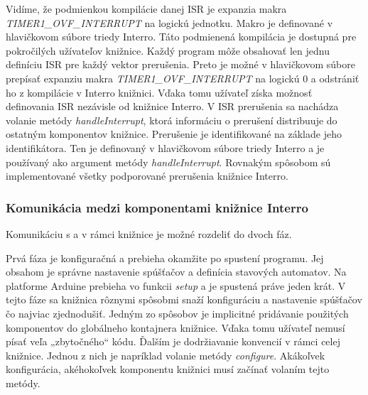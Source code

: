 Vidíme, že podmienkou kompilácie danej ISR je expanzia makra \\ \textit{TIMER1\_OVF\_INTERRUPT} na logickú jednotku. Makro je definované v hlavičkovom súbore triedy Interro.
Táto podmienená kompilácia je dostupná pre pokročilých užívateľov knižnice. Každý program môže obsahovať len jednu definíciu ISR pre každý vektor prerušenia. Preto je
možné v hlavičkovom súbore prepísať expanziu makra \textit{TIMER1\_OVF\_INTERRUPT} na logickú 0 a odstrániť ho z kompilácie v Interro knižnici. Vďaka tomu užívateľ získa
možnosť definovania ISR nezávisle od knižnice Interro. V ISR prerušenia sa nachádza volanie metódy \textit{handleInterrupt}, ktorá informáciu o prerušení distribuuje
do ostatným komponentov knižnice. Prerušenie je identifikované na základe jeho identifikátora. Ten je definovaný v hlavičkovom súbore triedy Interro a je používaný
ako argument metódy \textit{handleInterrupt}.
Rovnakým spôsobom sú implementované všetky podporované prerušenia knižnice Interro.

\subsubsection{Komunikácia medzi komponentami knižnice Interro}
\noindent \par
Komunikáciu s a v rámci knižnice je možné rozdeliť do dvoch fáz. \par
Prvá fáza je konfiguračná a prebieha okamžite po spustení programu. Jej obsahom je správne
nastavenie spúšťačov a definícia stavových automatov. Na platforme Arduine prebieha vo funkcii \textit{setup} a je spustená práve jeden krát. V tejto fáze sa knižnica
rôznymi spôsobmi snaží konfiguráciu a nastavenie spúšťačov čo najviac zjednodušiť. Jedným zo spôsobov je implicitné pridávanie použitých komponentov do globálneho
kontajnera knižnice. Vďaka tomu užívateľ nemusí písať veľa „zbytočného“ kódu. Ďalším je dodržiavanie konvencií v rámci celej knižnice. Jednou z nich je napríklad
volanie metódy \textit{configure}. Akákoľvek konfigurácia, akéhokoľvek komponentu knižnici musí začínať volaním tejto metódy.  \par

